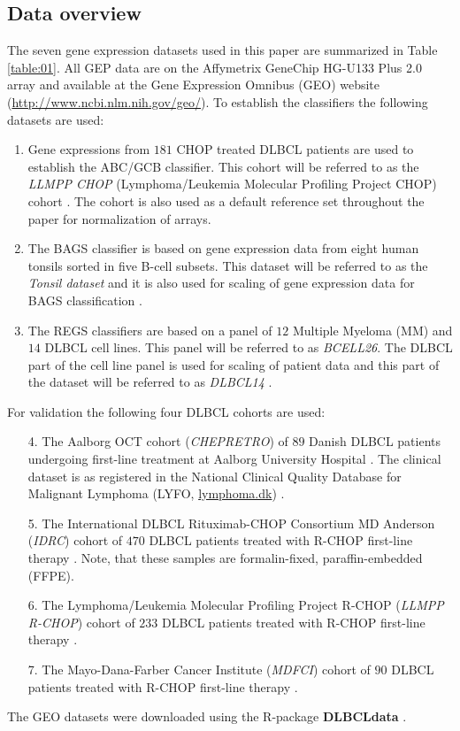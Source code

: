 \documentclass[twocolumn]{bmcart}%
\newcommand{\R}{\textsf{R}}
\newcommand{\pkg}[1]{\textbf{#1}}
\begin{document}
\subsection{Data overview}
The seven gene expression datasets used in this paper are summarized in Table \ref{table:01}.
All GEP data are on the Affymetrix GeneChip HG-U133 Plus 2.0 array and available at the Gene Expression Omnibus (GEO) \cite{Barrett2013} website (\url{http://www.ncbi.nlm.nih.gov/geo/}).
To establish the classifiers the following datasets are used:
\begin{enumerate}
  \item Gene expressions from $181$ CHOP treated DLBCL patients are used to establish the ABC/GCB classifier.
  This cohort will be referred to as the \emph{LLMPP CHOP} (Lymphoma/Leukemia Molecular Profiling Project CHOP) cohort \cite{Lenz2008a}.
  The cohort is also used as a default reference set throughout the paper for normalization of arrays.
  \item The BAGS classifier is based on gene expression data from eight human tonsils sorted in five B-cell subsets.
  This dataset will be referred to as the \emph{Tonsil dataset} and it is also used for scaling of gene expression data for BAGS classification \cite{DybkaerBoegsted2015}.
  \item The REGS classifiers are based on a panel of $12$ Multiple Myeloma (MM) and $14$ DLBCL cell lines.
  This panel will be referred to as \emph{BCELL26}.
  The DLBCL part of the cell line panel is used for scaling of patient data and this part of the dataset will be referred to as   \emph{DLBCL14} \cite{Falgreen2015}.
\end{enumerate}
For validation the following four DLBCL cohorts are used:
\begin{enumerate}
  \item[4.] The Aalborg OCT cohort (\emph{CHEPRETRO}) of $89$ Danish DLBCL patients undergoing first-line treatment at Aalborg University Hospital \cite{DybkaerBoegsted2015}.
  The clinical dataset is as registered in the National Clinical Quality Database for Malignant Lymphoma (LYFO, \url{lymphoma.dk}) \cite{Gang2012}.
  \item[5.] The International DLBCL Rituximab-CHOP Consortium MD Anderson (\emph{IDRC}) cohort of $470$ DLBCL patients treated with R-CHOP first-line therapy \cite{Visco2012}.
  Note, that these samples are formalin-fixed, paraffin-embedded (FFPE).
  \item[6.] The Lymphoma/Leukemia Molecular Profiling Project R-CHOP (\emph{LLMPP R-CHOP}) cohort of $233$ DLBCL patients treated with R-CHOP first-line therapy \cite{Lenz2008a}.
  \item[7.] The Mayo-Dana-Farber Cancer Institute (\emph{MDFCI}) cohort of $90$ DLBCL patients treated with R-CHOP first-line therapy \cite{Monti2012a}.
\end{enumerate}
The GEO datasets were downloaded using the \R{}-package \pkg{DLBCLdata} \cite{DLBCLdata}.
\end{document}

